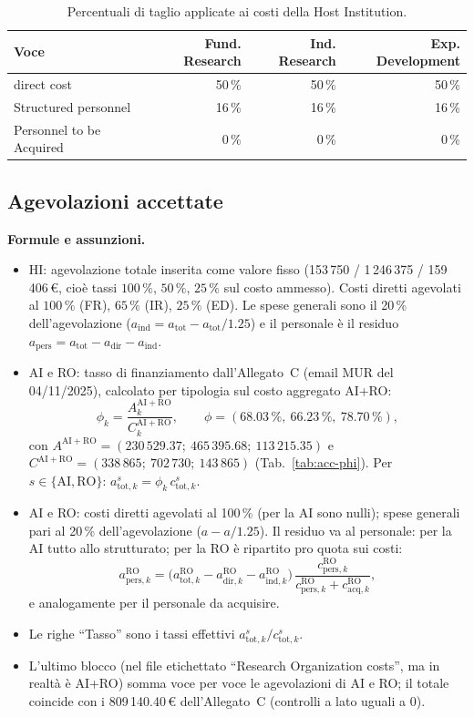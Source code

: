 \documentclass{plan4ari_report}
\begin{document}
\begin{table}[H]\centering\small
\caption{Percentuali di taglio applicate ai costi della Host Institution.}\label{tab:acc-cut}
\begin{tabular}{lrrr}\toprule
\textbf{Voce} & \textbf{Fund. Research} & \textbf{Ind. Research} & \textbf{Exp. Development} \\\midrule
\quad direct cost & 50\,\% & 50\,\% & 50\,\% \\
\quad Structured personnel & 16\,\% & 16\,\% & 16\,\% \\
\quad Personnel to be Acquired & 0\,\% & 0\,\% & 0\,\% \\
\bottomrule\end{tabular}
\end{table}



\subsection{Agevolazioni accettate}
\textbf{Formule e assunzioni.}
\begin{itemize}
  \item HI: agevolazione totale inserita come valore fisso (153\,750 / 1\,246\,375 / 159\,406\,\euro, cio\`e tassi $100\,\%$, $50\,\%$, $25\,\%$ sul costo ammesso). Costi diretti agevolati al $100\,\%$ (FR), $65\,\%$ (IR), $25\,\%$ (ED). Le spese generali sono il 20\,\% dell'agevolazione ($a_{\mathrm{ind}} = a_{\mathrm{tot}} - a_{\mathrm{tot}}/1.25$) e il personale \`e il residuo $a_{\mathrm{pers}} = a_{\mathrm{tot}} - a_{\mathrm{dir}} - a_{\mathrm{ind}}$.
  \item AI e RO: tasso di finanziamento dall'Allegato~C (email MUR del 04/11/2025), calcolato per tipologia sul costo aggregato AI+RO:
  \[ \phi_k = \frac{A^{\mathrm{AI+RO}}_k}{C^{\mathrm{AI+RO}}_k},\qquad \phi = (68.03\,\%,\ 66.23\,\%,\ 78.70\,\%), \]
  con $A^{\mathrm{AI+RO}} = (230\,529.37;\ 465\,395.68;\ 113\,215.35)$ e $C^{\mathrm{AI+RO}} = (338\,865;\ 702\,730;\ 143\,865)$ (Tab.~\ref{tab:acc-phi}). Per $s\in\{\mathrm{AI},\mathrm{RO}\}$: $a^{s}_{\mathrm{tot},k} = \phi_k\, c^{s}_{\mathrm{tot},k}$.
  \item AI e RO: costi diretti agevolati al 100\,\% (per la AI sono nulli); spese generali pari al 20\,\% dell'agevolazione ($a - a/1.25$). Il residuo va al personale: per la AI tutto allo strutturato; per la RO \`e ripartito pro quota sui costi:
  \[ a^{\mathrm{RO}}_{\mathrm{pers},k} = \bigl(a^{\mathrm{RO}}_{\mathrm{tot},k} - a^{\mathrm{RO}}_{\mathrm{dir},k} - a^{\mathrm{RO}}_{\mathrm{ind},k}\bigr)\,\frac{c^{\mathrm{RO}}_{\mathrm{pers},k}}{c^{\mathrm{RO}}_{\mathrm{pers},k}+c^{\mathrm{RO}}_{\mathrm{acq},k}}, \]
  e analogamente per il personale da acquisire.
  \item Le righe ``Tasso'' sono i tassi effettivi $a^{s}_{\mathrm{tot},k}/c^{s}_{\mathrm{tot},k}$.
  \item L'ultimo blocco (nel file etichettato ``Research Organization costs'', ma in realt\`a \`e AI+RO) somma voce per voce le agevolazioni di AI e RO; il totale coincide con i 809\,140.40\,\euro{} dell'Allegato~C (controlli a lato uguali a 0).
\end{itemize}
\end{document}
